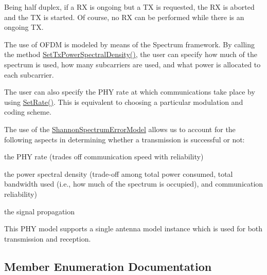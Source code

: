 Being half duplex, if a RX is ongoing but a TX is requested, the RX is aborted and the TX is started. Of course, no RX can be performed while there is an ongoing TX.

The use of O\+F\+DM is modeled by means of the Spectrum framework. By calling the method \hyperlink{classns3_1_1HalfDuplexIdealPhy_ae1502bc7c5a66115a83ca17bb9aa9877}{Set\+Tx\+Power\+Spectral\+Density()}, the user can specify how much of the spectrum is used, how many subcarriers are used, and what power is allocated to each subcarrier.

The user can also specify the P\+HY rate at which communications take place by using \hyperlink{classns3_1_1HalfDuplexIdealPhy_a24f7594f5b76f4f426aa52268bbc3363}{Set\+Rate()}. This is equivalent to choosing a particular modulation and coding scheme.

The use of the \hyperlink{classns3_1_1ShannonSpectrumErrorModel}{Shannon\+Spectrum\+Error\+Model} allows us to account for the following aspects in determining whether a transmission is successful or not\+:
\begin{DoxyItemize}
\item the P\+HY rate (trades off communication speed with reliability)
\item the power spectral density (trade-\/off among total power consumed, total bandwidth used (i.\+e., how much of the spectrum is occupied), and communication reliability)
\item the signal propagation
\end{DoxyItemize}

This P\+HY model supports a single antenna model instance which is used for both transmission and reception. 

\subsection{Member Enumeration Documentation}
